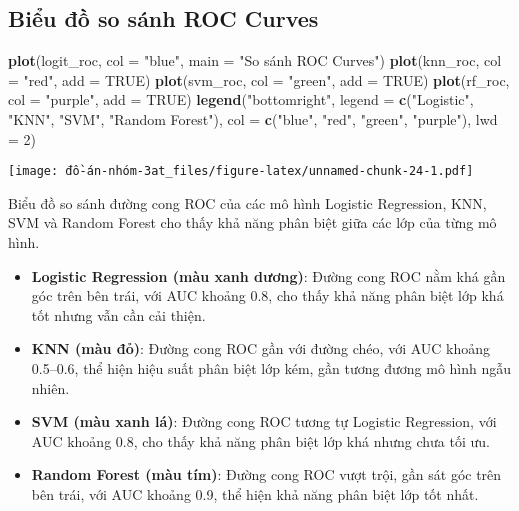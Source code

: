 \documentclass[
]{article}
\newenvironment{Shaded}{\begin{snugshade}}{\end{snugshade}}
\newcommand{\AttributeTok}[1]{\textcolor[rgb]{0.13,0.29,0.53}{#1}}
\newcommand{\ConstantTok}[1]{\textcolor[rgb]{0.56,0.35,0.01}{#1}}
\newcommand{\DecValTok}[1]{\textcolor[rgb]{0.00,0.00,0.81}{#1}}
\newcommand{\FunctionTok}[1]{\textcolor[rgb]{0.13,0.29,0.53}{\textbf{#1}}}
\newcommand{\NormalTok}[1]{#1}
\newcommand{\StringTok}[1]{\textcolor[rgb]{0.31,0.60,0.02}{#1}}
\providecommand{\tightlist}{%
  \setlength{\itemsep}{0pt}\setlength{\parskip}{0pt}}
\begin{document}
\subsection{Biểu đồ so sánh ROC Curves}\label{sec-roc-compare}

\begin{Shaded}
\begin{Highlighting}[]
\FunctionTok{plot}\NormalTok{(logit\_roc, }\AttributeTok{col =} \StringTok{"blue"}\NormalTok{, }\AttributeTok{main =} \StringTok{"So sánh ROC Curves"}\NormalTok{)}
\FunctionTok{plot}\NormalTok{(knn\_roc, }\AttributeTok{col =} \StringTok{"red"}\NormalTok{, }\AttributeTok{add =} \ConstantTok{TRUE}\NormalTok{)}
\FunctionTok{plot}\NormalTok{(svm\_roc, }\AttributeTok{col =} \StringTok{"green"}\NormalTok{, }\AttributeTok{add =} \ConstantTok{TRUE}\NormalTok{)}
\FunctionTok{plot}\NormalTok{(rf\_roc, }\AttributeTok{col =} \StringTok{"purple"}\NormalTok{, }\AttributeTok{add =} \ConstantTok{TRUE}\NormalTok{)}
\FunctionTok{legend}\NormalTok{(}\StringTok{"bottomright"}\NormalTok{, }\AttributeTok{legend =} \FunctionTok{c}\NormalTok{(}\StringTok{"Logistic"}\NormalTok{, }\StringTok{"KNN"}\NormalTok{, }\StringTok{"SVM"}\NormalTok{, }\StringTok{"Random Forest"}\NormalTok{),}
       \AttributeTok{col =} \FunctionTok{c}\NormalTok{(}\StringTok{"blue"}\NormalTok{, }\StringTok{"red"}\NormalTok{, }\StringTok{"green"}\NormalTok{, }\StringTok{"purple"}\NormalTok{), }\AttributeTok{lwd =} \DecValTok{2}\NormalTok{)}
\end{Highlighting}
\end{Shaded}

\texttt{[image: đồ-án-nhóm-3at\_files/figure-latex/unnamed-chunk-24-1.pdf]}

Biểu đồ so sánh đường cong ROC của các mô hình Logistic Regression, KNN,
SVM và Random Forest cho thấy khả năng phân biệt giữa các lớp của từng
mô hình.

\begin{itemize}
\tightlist
\item
  \textbf{Logistic Regression (màu xanh dương)}: Đường cong ROC nằm khá
  gần góc trên bên trái, với AUC khoảng 0.8, cho thấy khả năng phân biệt
  lớp khá tốt nhưng vẫn cần cải thiện.
\item
  \textbf{KNN (màu đỏ)}: Đường cong ROC gần với đường chéo, với AUC
  khoảng 0.5--0.6, thể hiện hiệu suất phân biệt lớp kém, gần tương đương
  mô hình ngẫu nhiên.
\item
  \textbf{SVM (màu xanh lá)}: Đường cong ROC tương tự Logistic
  Regression, với AUC khoảng 0.8, cho thấy khả năng phân biệt lớp khá
  nhưng chưa tối ưu.
\item
  \textbf{Random Forest (màu tím)}: Đường cong ROC vượt trội, gần sát
  góc trên bên trái, với AUC khoảng 0.9, thể hiện khả năng phân biệt lớp
  tốt nhất.
\end{itemize}
\end{document}
